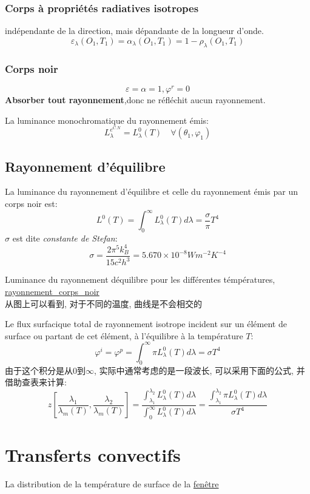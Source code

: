 \documentclass{article}
\begin{document}
\subsubsection{Corps \`a propri\'et\'es radiatives isotropes}
ind\'ependante de la direction, mais d\'epandante de la longueur d'onde.
$$\varepsilon_{\lambda}(O_1, T_1) = \alpha_{\lambda}(O_1, T_1) = 1 - \rho_{\lambda}(O_1, T_1)$$

\subsubsection{Corps noir}
$$\varepsilon=\alpha=1,\varphi^r=0$$
\textbf{Absorber tout rayonnement},donc ne r\'efl\'echit aucun rayonnement.

La luminance monochromatique du rayonnement \'emis:
$$L_{\lambda}^{e^{C.N}}= L_{\lambda}^0(T) \quad \forall(\theta_1,\varphi_1)$$

\subsection{Rayonnement d'\'equilibre}
La luminance du rayonnement d'\'equilibre et celle du rayonnement \'emis par un corps noir est:
$$L^0(T)=\int_{0}^{\infty}L_{\lambda}^0(T)d \lambda =\frac{\sigma}{\pi}T^4$$
$\sigma$ est dite \textit{constante de Stefan}:
$$\sigma=\frac{ 2\pi^5 k_B^4}{15c^2 h^3}=5.670\times 10^{-8} Wm^{-2}K^{-4}$$

Luminance du rayonnement d\'equilibre pour les diff\'erentes t\'emp\'eratures, \href{http://www.afhalifax.ca/magazine/wp-content/sciences/Planck/Le\%20corps\%20noir\_files/rayonnement\_corps\_noir.png}{rayonnement\_corps\_noir}\\
从图上可以看到, 对于不同的温度, 曲线是不会相交的

Le flux surfacique total de rayonnement isotrope incident sur un \'el\'ement de surface ou partant de cet \'el\'ement, \`a l'\'equilibre \`a la temp\'erature $T$:
$$\varphi^i=\varphi^p=\int_{0}^{\infty}\pi L_{\lambda}^0(T)d \lambda =\sigma T^4$$
由于这个积分是从$0$到$\infty$, 实际中通常考虑的是一段波长, 可以采用下面的公式, 并借助查表来计算:
$$
z[\frac{ \lambda _1}{\lambda _m(T)}, \frac{ \lambda _2}{\lambda _m(T)}]
= \frac{ \int_{\lambda _1}^{\lambda _2} L_{\lambda}^0(T)d \lambda }{\int_{0}^{\infty}L_{\lambda}^0(T)d \lambda }
= \frac{ \int_{\lambda _1}^{\lambda _2}\pi L_{\lambda}^0(T)d \lambda }{\sigma T^4}
$$

\section{Transferts convectifs}
La distribution de la température de surface de la \href{http://i.imgbox.com/o4djIdyE.png}{fenêtre}
\end{document}
